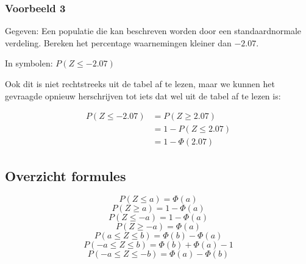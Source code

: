 \documentclass[a4paper,12pt, twoside]{article}
\begin{document}
\subsubsection*{Voorbeeld 3}

Gegeven: Een populatie die kan beschreven worden door een standaardnormale verdeling. Bereken het percentage waarnemingen kleiner dan $-2.07$.

In symbolen: $P(Z\leq -2.07)$

Ook dit is niet rechtstreeks uit de tabel af te lezen, maar we kunnen het gevraagde opnieuw herschrijven tot iets dat wel uit de tabel af te lezen is:

\begin{minipage}{0.5\textwidth}
\begin{align*}
  P(Z\leq -2.07) &= P(Z \geq 2.07)\\
                 &= 1 - P(Z \leq 2.07)\\
                 &= 1 - \Phi(2.07)
\end{align*}
\end{minipage}
\begin{minipage}{0.5\textwidth}
\vspace*{1cm}
\begin{center}
\end{center}
\end{minipage}

\pagebreak
\subsection{Overzicht formules}
\begin{multicols}{2}
  $$P(Z\leq a)=\Phi(a)$$
  $$P(Z\geq a)=1-\Phi(a)$$
  $$P(Z\leq -a)=1-\Phi(a)$$
  $$P(Z\geq -a)=\Phi(a)$$
  \vfill
  $$P(a\leq Z \leq b)=\Phi(b)-\Phi(a)$$
  $$P(-a\leq Z \leq b)=\Phi(b)+\Phi(a)-1$$
  $$P(-a\leq Z \leq -b)=\Phi(a)-\Phi(b)$$
\end{multicols}
\end{document}
